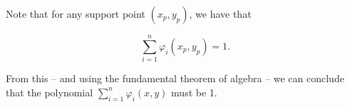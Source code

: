 \documentclass[a4paper, twoside]{article}
\renewcommand{\phi}{\varphi}
\begin{document}
Note that for any support point $(x_p,y_p)$, we have that

\begin{equation}
  \sum_{i=1}^n \phi_i(x_p,y_p) = 1.
\end{equation}

From this -- and using the fundamental theorem of algebra -- we can conclude that the polynomial $\sum_{i=1}^n \phi_i(x,y)$ must be 1.




\end{document}
